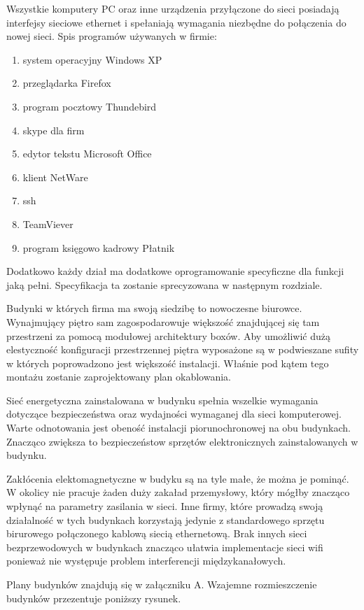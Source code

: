 \documentclass{report}
\begin{document}
Wszystkie komputery PC oraz inne urządzenia przyłączone do sieci posiadają interfejsy sieciowe ethernet i spełaniają wymagania niezbędne
do połączenia do nowej sieci. Spis programów używanych w firmie:
\begin{enumerate}
 \item system operacyjny Windows XP
 \item przeglądarka Firefox
 \item program pocztowy Thundebird
 \item skype dla firm
 \item edytor tekstu Microsoft Office
 \item klient NetWare
 \item ssh
 \item TeamViever
 \item program księgowo kadrowy Płatnik
\end{enumerate}

Dodatkowo każdy dział ma dodatkowe oprogramowanie specyficzne dla funkcji jaką pełni. Specyfikacja ta zostanie sprecyzowana w następnym rozdziale.

Budynki w których firma ma swoją siedzibę to nowoczesne biurowce. Wynajmujący piętro sam zagospodarowuje większość 
znajdującej się tam przestrzeni za pomocą modułowej architektury boxów. Aby umożliwić dużą elestyczność konfiguracji przestrzennej piętra 
wyposażone są w podwieszane sufity w których poprowadzono jest większość instalacji. Właśnie pod kątem tego montażu zostanie zaprojektowany plan
okablowania.

Sieć energetyczna zainstalowana w budynku spełnia wszelkie wymagania dotyczące bezpieczeństwa oraz wydajności wymaganej dla sieci komputerowej.
Warte odnotowania jest obeność instalacji piorunochronowej na obu budynkach. Znacząco zwiększa to bezpieczeństow sprzętów elektronicznych zainstalowanych
w budynku.

Zakłócenia elektomagnetyczne w budyku są na tyle małe, że można je pominąć. W okolicy nie pracuje żaden duży zakaład przemysłowy, który mógłby 
znacząco wpłynąć na parametry zasilania w sieci. Inne firmy, które prowadzą swoją działalność w tych budynkach korzystają jedynie z standardowego
sprzętu birurowego połączonego kablową siecią ethernetową. Brak innych sieci bezprzewodowych w budynkach znacząco ułatwia implementacje sieci wifi
ponieważ nie występuje problem interferencji międzykanałowych.


\pagebreak[4]
Plany budynków znajdują się w załączniku A. Wzajemne rozmieszczenie budynków przezentuje poniższy rysunek.
\end{document}
